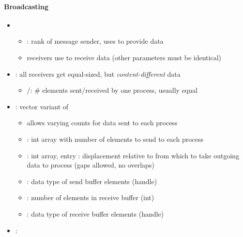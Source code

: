 \paragraph{Broadcasting}
\begin{itemize}
  \item {}
  \begin{itemize}
    \item {}: rank of message sender, uses  to provide data
    \item receivers use  to receive data (other parameters must be identical)
  \end{itemize}
  \item {}: all receivers get equal-sized, but \emph{content-different} data
  \begin{itemize}
    \item {}/: \# elements sent/received by one process, usually equal
  \end{itemize}
  \item {}: vector variant of 
  \begin{itemize}
    \item allows varying counts for data sent to each process
    \item {}: int array with number of elements to send to each process
    \item {}: int array, entry : displacement relative to  from which to take outgoing data to process  (gaps allowed, no overlaps)
    \item {}: data type of send buffer elements (handle)
    \item {}: number of elements in receive buffer (int)
    \item {}: data type of receive buffer elements (handle)
  \end{itemize}
  \item {}:

\end{itemize}
